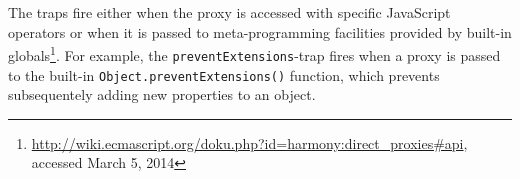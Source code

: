% 

The traps fire either when the proxy is accessed with specific JavaScript operators or when it is passed to meta-programming facilities provided by built-in globals\footnote{\url{http://wiki.ecmascript.org/doku.php?id=harmony:direct_proxies\#api}, accessed March 5, 2014}.
For example, the \lstinline{preventExtensions}-trap fires when a proxy is passed to the built-in \lstinline{Object.preventExtensions()} function, which prevents subsequentely adding new properties to an object.








